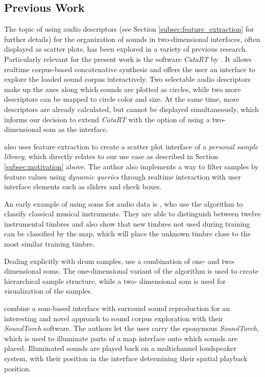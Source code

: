 \subsection{Previous Work}
\label{subsec:previous_work}
The topic of using audio descriptors (see Section
\ref{subsec:feature_extraction} for further details) for the organization of
sounds in two-dimensional interfaces, often displayed as scatter plots, has been
explored in a variety of previous research. Particularly relevant for the
present work is the software \textit{CataRT} by \citet{schwarz2006}. It allows
realtime corpus-based concatenative synthesis and offers the user an interface
to explore the loaded sound corpus interactively. Two selectable audio
descriptors make up the axes along which sounds are plotted as circles, while
two more descriptors can be mapped to circle color and size. At the same time,
more descriptors are already calculated, but cannot be displayed simultaneously,
which informs our decision to extend \textit{CataRT} with the option of using a
two-dimensional \gls{som} as the interface.

\citet{coleman2007} also uses feature extraction to create a scatter plot
interface of a \textit{personal sample library}, which directly relates to our
use case as described in Section \ref{subsec:motivation} above. The author
also implements a way to filter samples by feature values using
\textit{dynamic queries} through realtime interaction with user interface
elements such as sliders and check boxes.

An early example of using \glspl{som} for audio data is \citet{cosi1994}, who
use the algorithm to classify classical musical instruments. They are able to
distinguish between twelve instrumental timbres and also show that new timbres
not used during training can be classified by the map, which will place the
unknown timbre close to the most similar training timbre.

\smallskip

Dealing explicitly
with drum samples, \citet{pampalk2004} use a combination of one- and two-
dimensional \glspl{som}. The one-dimensional variant of the algorithm is used
to create hierarchical sample structure, while a two- dimensional \gls{som} is
used for visualization of the samples.

\smallskip

\citet{heise2008} combine a \gls{som}-based interface with surround sound
reproduction for an interesting and novel approach to sound corpus exploration
with their \textit{SoundTorch} software. The authors let the user carry the
eponymous \textit{SoundTorch}, which is used to illuminate parts of a map
interface onto which sounds are placed. Illuminated sounds are played back on a
multichannel loudspeaker system, with their position in the interface
determining their spatial playback position.

